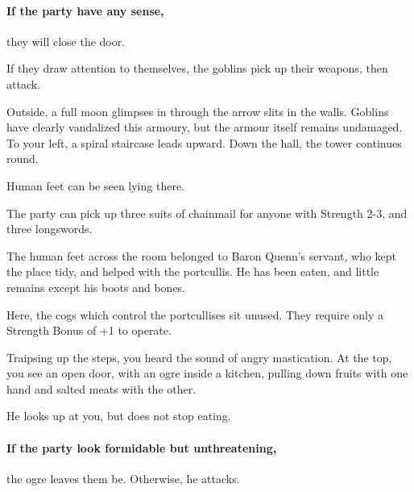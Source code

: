 \begin{multicols}{2}
\paragraph{If the party have any sense,}
they will close the door.

If they draw attention to themselves, the goblins pick up their weapons, then attack.

\goblin


\begin{boxtext}

	Outside, a full moon glimpses in through the arrow slits in the walls.
	Goblins have clearly vandalized this armoury, but the armour itself remains undamaged.
	To your left, a spiral staircase leads upward.
	Down the hall, the tower continues round.

	Human feet can be seen lying there.

\end{boxtext}


The party can pick up three suits of chainmail for anyone with Strength 2-3, and three longswords.

The human feet across the room belonged to Baron Quenn's servant, who kept the place tidy, and helped with the portcullis.
He has been eaten, and little remains except his boots and bones.


Here, the cogs which control the portcullises sit unused.
They require only a Strength Bonus of +1 to operate.


\begin{boxtext}

	Traipsing up the steps, you heard the sound of angry mastication.
	At the top, you see an open door, with an ogre inside a kitchen, pulling down fruits with one hand and salted meats with the other.

	He looks up at you, but does not stop eating.

\end{boxtext}

\paragraph{If the party look formidable but unthreatening,}
the ogre leaves them be.
Otherwise, he attacks.


\end{multicols}
